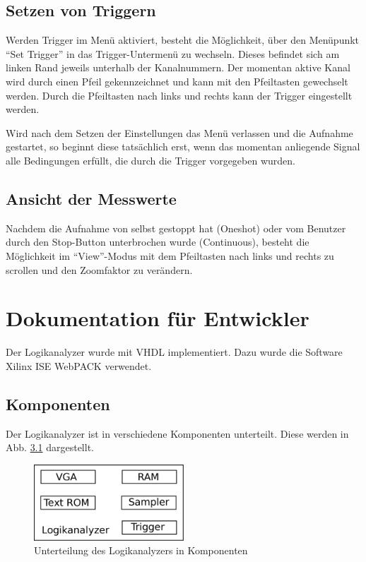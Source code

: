 \documentclass[IN,ngerman,utf8,12pt]{tumbook}
\begin{document}
\section{Setzen von Triggern}

Werden Trigger im Menü aktiviert, besteht die Möglichkeit, über den Menüpunkt ``Set Trigger'' in das Trigger-Untermenü zu wechseln. Dieses befindet sich am linken Rand jeweils unterhalb der Kanalnummern. Der momentan aktive Kanal wird durch einen Pfeil gekennzeichnet und kann mit den Pfeiltasten gewechselt werden. Durch die Pfeiltasten nach links und rechts kann der Trigger eingestellt werden.

Wird nach dem Setzen der Einstellungen das Menü verlassen und die Aufnahme gestartet, so beginnt diese tatsächlich erst, wenn das momentan anliegende Signal alle Bedingungen erfüllt, die durch die Trigger vorgegeben wurden.

\section{Ansicht der Messwerte}
Nachdem die Aufnahme von selbst gestoppt hat (Oneshot) oder vom Benutzer durch den Stop-Button unterbrochen wurde (Continuous), besteht die Möglichkeit im ``View''-Modus mit dem Pfeiltasten nach links und rechts zu scrollen und den Zoomfaktor zu verändern.

\chapter{Dokumentation für Entwickler}

Der Logikanalyzer wurde mit VHDL implementiert.
Dazu wurde die Software Xilinx ISE WebPACK verwendet.

\section{Komponenten}

Der Logikanalyzer ist in verschiedene Komponenten unterteilt.
Diese werden in Abb. \ref{abb:komp} dargestellt.

\begin{figure}
    \centerline{
        \includegraphics[width=0.5\textwidth]{img/komponenten}
    }
    \label{abb:komp}
    \caption{Unterteilung des Logikanalyzers in Komponenten}
\end{figure}
\end{document}

